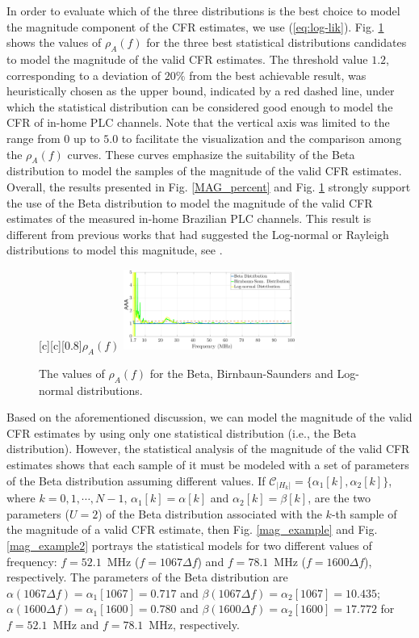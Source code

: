\documentclass[journal]{IEEEtran}
\begin{document}
In order to evaluate which of the three distributions is the best choice to model the magnitude component of the \ac{CFR} estimates, we use (\ref{eq:log-lik}). Fig. \ref{fig:Log_like} shows the values of $\rho_{A}(f)$ for the three best statistical distributions candidates to model the magnitude of the valid \ac{CFR} estimates. The threshold value $1.2$, corresponding to a deviation of $20\%$ from the best achievable result, was heuristically chosen as the upper bound, indicated by a red dashed line, under which the statistical distribution can be considered good enough to model the \ac{CFR} of in-home \ac{PLC} channels. Note that the vertical axis was limited to the range from $0$ up to $5.0$ to facilitate the visualization and the comparison among the $\rho_{A} (f)$ curves. These curves emphasize the suitability of the Beta distribution to model the samples of the magnitude of the valid \ac{CFR} estimates. Overall, the results presented in Fig. \ref{MAG_percent} and Fig. \ref{fig:Log_like} strongly support the use of the Beta distribution to model the magnitude of the valid \ac{CFR} estimates of the measured in-home Brazilian \ac{PLC} channels. This result is different from previous works that had suggested the Log-normal or Rayleigh distributions to model this magnitude, see \cite{Galli:Wireline,RayleighPLC}.

\begin{figure}[h!]
	\centering
	[c][0.8]{$\rho_{A} (f)$}
	\includegraphics[width=0.5\textwidth]{images/LLH_BETA_BIRN_LogN_1.7.eps}
	\caption{The values of $\rho_{A} (f)$ for the Beta, Birnbaun-Saunders and Log-normal distributions.}
	\label{fig:Log_like}
\end{figure}

Based on the aforementioned discussion, we can model the magnitude of the valid \ac{CFR} estimates by using only one statistical distribution (i.e., the Beta distribution). However, the statistical analysis of the magnitude of the valid \ac{CFR} estimates shows that each sample of it must be modeled with a set of parameters of the Beta distribution assuming different values. If $\mathcal{C}_{|H_k|} = \{\alpha_{1}[k],\alpha_{2}[k]\}$, where $k=0,1,\cdots,N-1$,  $\alpha_{1}[k] = \alpha[k]$ and $\alpha_{2}[k] = \beta[k]$, are the two parameters ($U=2$) of the Beta distribution associated with the $k$-th sample of the magnitude of a valid \ac{CFR} estimate, then Fig. \ref{mag_example} and Fig. \ref{mag_example2} portrays the statistical models for two different values of frequency: $f=52.1$~MHz ($f = 1067\Delta f$) and $f=78.1$~MHz ($f = 1600\Delta f$), respectively. The parameters of the Beta distribution are  $\alpha(1067 \Delta f) = \alpha_{1}[1067]=0.717$ and $\beta( 1067 \Delta f) = \alpha_{2}[1067] = 10.435$; $\alpha(1600 \Delta f) = \alpha_{1}[1600] = 0.780$ and $\beta( 1600 \Delta f) = \alpha_{2}[1600]=17.772$ for $f=52.1$~MHz and $f=78.1$~MHz, respectively.
\end{document}
